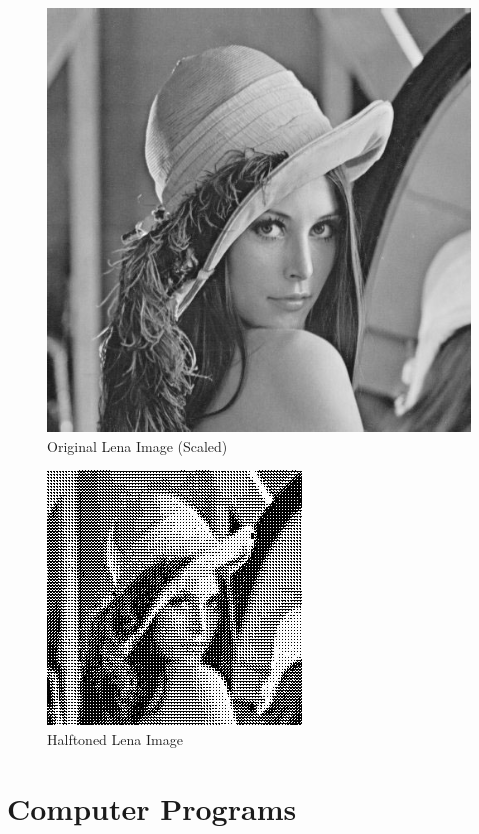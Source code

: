 \documentclass[11pt]{article}
\begin{document}
\begin{figure}[ht]
   \centering
   \includegraphics[scale=.4]{lena.jpg}
   \caption{Original Lena Image (Scaled)}
   \label{fig:lena}
\end{figure}

\begin{figure}[ht]
   \centering
   \includegraphics{halftone-lena33per50per.jpg}
   \caption{Halftoned Lena Image}
   \label{fig:lena-halftone}
\end{figure}

\clearpage
\appendix
\section{Computer Programs}



\newpage

\end{document}

